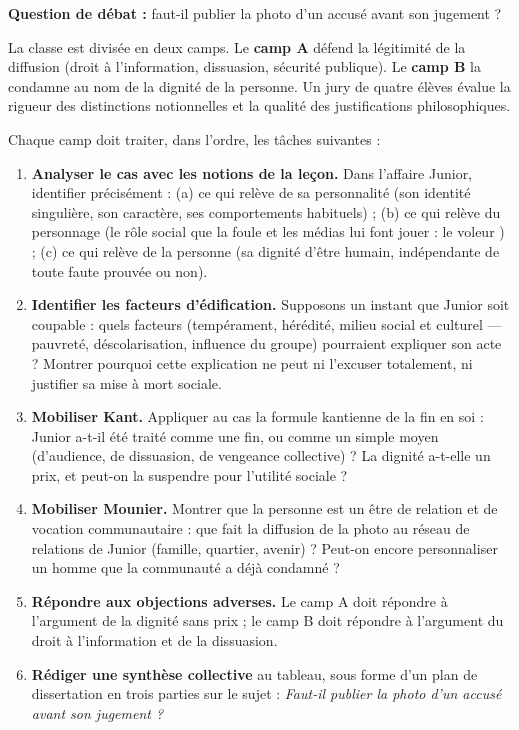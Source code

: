 \documentclass[11pt]{article}
\newcounter{popsec}
\newcounter{popsub}
\newcommand{\courssub}[1]{%
  \stepcounter{popsub}%
  \par\vspace{9pt}\noindent{\popxbold\fontsize{11.5}{13}\selectfont\color{popink}{\color{poporange}\thepopsec.\thepopsub}\hspace{6pt}#1}\par\nopagebreak\vspace{4pt}
}
\begin{document}
\textbf{Question de débat :} faut-il publier la photo d'un accusé avant son jugement ?

\courssub{Consignes}

La classe est divisée en deux camps. Le \textbf{camp A} défend la légitimité de la diffusion (droit à l'information, dissuasion, sécurité publique). Le \textbf{camp B} la condamne au nom de la dignité de la personne. Un jury de quatre élèves évalue la rigueur des distinctions notionnelles et la qualité des justifications philosophiques.

Chaque camp doit traiter, dans l'ordre, les tâches suivantes :

\begin{enumerate}
\item \textbf{Analyser le cas avec les notions de la leçon.} Dans l'affaire Junior, identifier précisément : (a) ce qui relève de sa personnalité (son identité singulière, son caractère, ses comportements habituels) ; (b) ce qui relève du personnage (le rôle social que la foule et les médias lui font jouer : \guillemotleft le voleur \guillemotright) ; (c) ce qui relève de la personne (sa dignité d'être humain, indépendante de toute faute prouvée ou non).
\item \textbf{Identifier les facteurs d'édification.} Supposons un instant que Junior soit coupable : quels facteurs (tempérament, hérédité, milieu social et culturel — pauvreté, déscolarisation, influence du groupe) pourraient expliquer son acte ? Montrer pourquoi cette explication ne peut ni l'excuser totalement, ni justifier sa mise à mort sociale.
\item \textbf{Mobiliser Kant.} Appliquer au cas la formule kantienne de la fin en soi : Junior a-t-il été traité comme une fin, ou comme un simple moyen (d'audience, de dissuasion, de vengeance collective) ? La dignité a-t-elle un prix, et peut-on la suspendre pour l'utilité sociale ?
\item \textbf{Mobiliser Mounier.} Montrer que la personne est un être de relation et de vocation communautaire : que fait la diffusion de la photo au réseau de relations de Junior (famille, quartier, avenir) ? Peut-on encore \guillemotleft personnaliser \guillemotright un homme que la communauté a déjà condamné ?
\item \textbf{Répondre aux objections adverses.} Le camp A doit répondre à l'argument de la dignité sans prix ; le camp B doit répondre à l'argument du droit à l'information et de la dissuasion.
\item \textbf{Rédiger une synthèse collective} au tableau, sous forme d'un plan de dissertation en trois parties sur le sujet : \emph{Faut-il publier la photo d'un accusé avant son jugement ?}
\end{enumerate}
\end{document}
